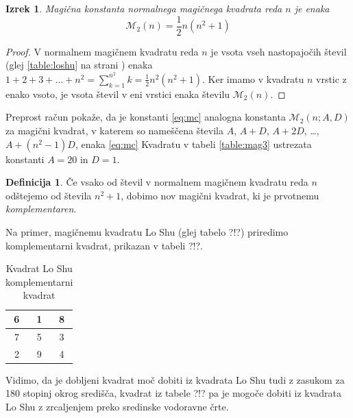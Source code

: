 \documentclass[a4paper,12pt]{article}
\theoremstyle{definition}
\newtheorem{definicija}{Definicija}
\theoremstyle{plain}
\newtheorem{izrek}{Izrek}
\newcommand{\m}{\mathcal{M}}
\begin{document}
\begin{izrek}
Magična konstanta normalnega magičnega kvadrata reda $n$
je enaka
\begin{equation}
\label{eq:mc}
\m_2(n) = \frac{1}{2} n(n^2+1)
\end{equation}
\end{izrek}

\begin{proof}
   V normalnem magičnem kvadratu reda $n$ je vsota vseh nastopajočih
   števil (glej \ref{table:loshu} na strani \pageref{3}) enaka
   $1+2+3+\dots+n^2=\sum_{k=1}^{n^2}k=\frac{1}{2}n^2(n^2+1)$. Ker imamo
   v kvadratu $n$ vrstic z enako vsoto, je vsota števil v eni vrstici
   enaka številu $\m_2(n)$. %
\end{proof}

Preprost račun pokaže, da je konstanti \eqref{eq:mc} analogna konstanta
$\m_2(n;A,D)$ za magični kvadrat, v katerem so nameščena števila
$A$, $A+D$, $A+2D$, \dots, $A+(n^2-1)D$, enaka %
\eqref{eq:mc}
Kvadratu v tabeli \ref{table:mag3} ustrezata konstanti $A=20$ in $D=1$.

\begin{definicija}
Če vsako od števil v normalnem magičnem kvadratu reda $n$ odštejemo
 od števila $n^2+1$, dobimo nov magični kvadrat, ki je prvotnemu
\emph{komplementaren}.
\end{definicija}
      

Na primer, magičnemu kvadratu Lo Shu (glej tabelo ?!?) priredimo
komplementarni kvadrat, prikazan v tabeli ?!?.
%
\begin{table}[h!]
\centering
\caption{Kvadrat Lo Shu komplementarni kvadrat}
\label{ttable:closhu}
\begin{tabular}{ccc}\toprule
   6 & 1 & 8 \\ \midrule
 7 & 5 & 3 \\ \midrule
 2 & 9 & 4 \\ \bottomrule
\end{tabular}
   
\end{table}


Vidimo, da je dobljeni kvadrat moč dobiti iz kvadrata Lo Shu tudi z zasukom za
180 stopinj okrog središča, kvadrat iz tabele ?!? pa je mogoče dobiti
iz kvadrata Lo Shu z zrcaljenjem preko sredinske vodoravne črte.
\end{document}
